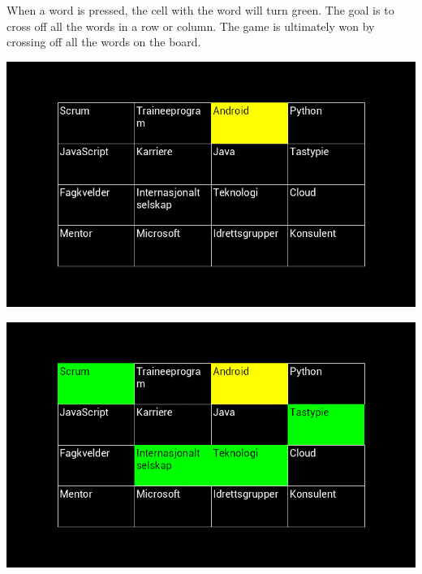 When a word is pressed, the cell with the word will turn green. The goal is to
cross off all the words in a row or column. The game is ultimately won by
crossing off all the words on the board.

\begin{center}
\includegraphics[scale=0.5]{Pikks/Board1}
\end{center}

\begin{center}
\includegraphics[scale=0.5]{Pikks/Board2}
\end{center}

